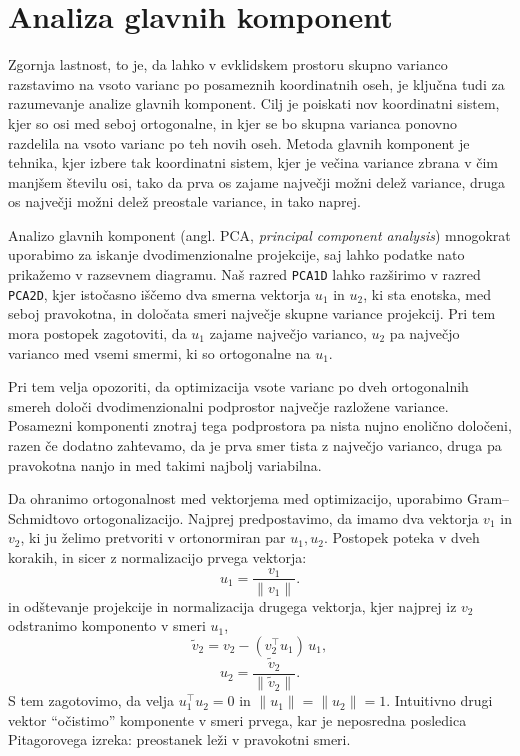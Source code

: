 \section{Analiza glavnih komponent}

Zgornja lastnost, to je, da lahko v evklidskem prostoru skupno varianco razstavimo na vsoto varianc po posameznih koordinatnih oseh, je ključna tudi za razumevanje analize glavnih komponent. Cilj je poiskati nov koordinatni sistem, kjer so osi med seboj ortogonalne, in kjer se bo skupna varianca ponovno razdelila na vsoto varianc po teh novih oseh. Metoda glavnih komponent je tehnika, kjer izbere tak koordinatni sistem, kjer je večina variance zbrana v čim manjšem številu osi, tako da prva os zajame največji možni delež variance, druga os največji možni delež preostale variance, in tako naprej.

Analizo glavnih komponent 
%
%
(angl. PCA, {\em principal component analysis}) mnogokrat uporabimo za iskanje dvodimenzionalne projekcije, saj lahko podatke nato prikažemo v razsevnem diagramu. Naš razred \texttt{PCA1D} lahko razširimo v razred \texttt{PCA2D}, kjer istočasno iščemo dva smerna vektorja $u_1$ in $u_2$, ki sta enotska, med seboj pravokotna, in določata smeri največje skupne variance projekcij. Pri tem mora postopek zagotoviti, da $u_1$ zajame največjo varianco, $u_2$ pa največjo varianco med vsemi smermi, ki so ortogonalne na $u_1$.

Pri tem velja opozoriti, da optimizacija vsote varianc po dveh ortogonalnih smereh določi dvodimenzionalni podprostor največje razložene variance. Posamezni komponenti znotraj tega podprostora pa nista nujno enolično določeni, razen če dodatno zahtevamo, da je prva smer tista z največjo varianco, druga pa pravokotna nanjo in med takimi najbolj variabilna.

Da ohranimo ortogonalnost med vektorjema med optimizacijo, uporabimo Gram--Schmidtovo ortogonalizacijo. Najprej predpostavimo, da imamo dva vektorja $v_1$ in $v_2$, ki ju želimo pretvoriti v ortonormiran par $u_1, u_2$. Postopek poteka v dveh korakih, in sicer z normalizacijo prvega vektorja:
\[
u_1 = \frac{v_1}{\|v_1\|}.
\]
%
in odštevanje projekcije in normalizacija drugega vektorja, kjer najprej iz $v_2$ odstranimo komponento v smeri $u_1$,
\[
\tilde{v}_2 = v_2 - (v_2^\top u_1)\, u_1,
\]
\[
u_2 = \frac{\tilde{v}_2}{\|\tilde{v}_2\|}.
\]
%
S tem zagotovimo, da velja $u_1^\top u_2 = 0$ in $\|u_1\| = \|u_2\| = 1$. Intuitivno drugi vektor ``očistimo'' komponente v smeri prvega, kar je neposredna posledica Pitagorovega izreka: preostanek leži v pravokotni smeri.


